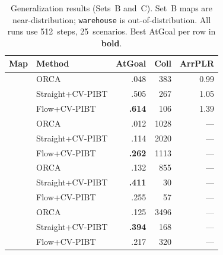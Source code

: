\begin{table}[t]
\centering
\caption{%
  Generalization results (Sets~B and~C).
  Set~B maps are near-distribution; \texttt{warehouse} is
  out-of-distribution.  All runs use 512~steps, 25~scenarios.
  Best AtGoal per row in \textbf{bold}.
}\label{tab:generalization}
\vspace{2pt}
\small
\setlength{\tabcolsep}{3.5pt}
\begin{tabular}{@{}l l rrr@{}}
\toprule
Map & Method & AtGoal & Coll & ArrPLR \\
\midrule
{}
  & ORCA             & .048 &  383 & 0.99 \\
  & Straight+CV-PIBT   & .505 &  267 & 1.05 \\
  & Flow+CV-PIBT       & \textbf{.614} &  106 & 1.39 \\
\midrule
{}
  & ORCA             & .012 & 1028 & --- \\
  & Straight+CV-PIBT   & .114 & 2020 & --- \\
  & Flow+CV-PIBT       & \textbf{.262} & 1113 & --- \\
\midrule
{}
  & ORCA             & .132 &  855 & --- \\
  & Straight+CV-PIBT   & \textbf{.411} &   30 & --- \\
  & Flow+CV-PIBT       & .255 &   57 & --- \\
\midrule
{}
  & ORCA             & .125 & 3496 & --- \\
  & Straight+CV-PIBT   & \textbf{.394} &  168 & --- \\
  & Flow+CV-PIBT       & .217 &  320 & --- \\
\bottomrule
\end{tabular}
\end{table}

